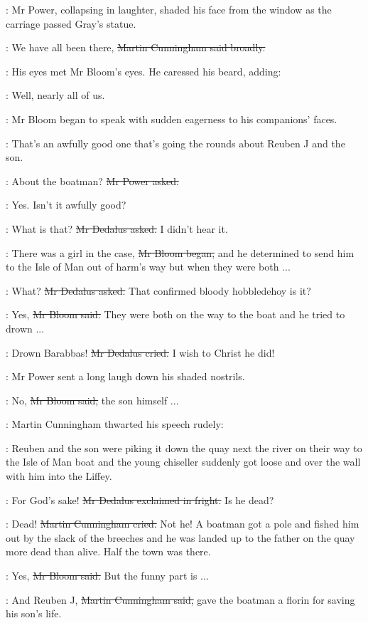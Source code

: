 :
Mr Power, collapsing in laughter,
shaded his face from the window as the carriage passed Gray's statue.

\cunningham:
We have all been there,
\sout{Martin Cunningham said broadly.}

:
His eyes met Mr Bloom's eyes.
He caressed his beard, adding:

\cunningham:
Well, nearly all of us.

:
Mr Bloom began to speak with sudden eagerness to his companions' faces.

\Bloom:
That's an awfully good one that's going the rounds
about Reuben J and the son.

\power:
About the boatman?
\sout{Mr Power asked.}

\Bloom:
Yes.
Isn't it awfully good?

\simon:
What is that?
\sout{Mr Dedalus asked.}
I didn't hear it.

\Bloom:
There was a girl in the case,
\sout{Mr Bloom began,}
and he determined to send him
to the Isle of Man out of harm's way
but when they were both ...

\simon:
What?
\sout{Mr Dedalus asked.}
That confirmed bloody hobbledehoy is it?

\Bloom:
Yes,
\sout{Mr Bloom said.}
They were both on the way to the boat and he tried to drown ...

\simon:
Drown Barabbas!
\sout{Mr Dedalus cried.}
I wish to Christ he did!

:
Mr Power sent a long laugh down his shaded nostrils.

\Bloom:
No,
\sout{Mr Bloom said,}
the son himself ...

:
Martin Cunningham thwarted his speech rudely:

\cunningham:
Reuben and the son were piking it down the quay next the river
on their way to the Isle of Man boat
and the young chiseller suddenly got loose
and over the wall with him
into the Liffey.

\simon:
For God's sake!
\sout{Mr Dedalus exclaimed in fright.}
Is he dead?

\cunningham:
Dead!
\sout{Martin Cunningham cried.}
Not he!
A boatman got a pole and fished him out by the slack of the breeches
and he was landed up to the father on the quay
more dead than alive.
Half the town was there.

\Bloom:
Yes,
\sout{Mr Bloom said.}
But the funny part is ...

\cunningham:
And Reuben J,
\sout{Martin Cunningham said,}
gave the boatman a florin for saving his son's life.

